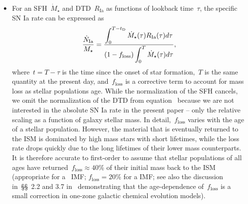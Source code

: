 \documentclass[ms.tex]{subfiles}
\begin{document}
\begin{itemize}
	\item For an SFH~$\dot{M}_\star$ and DTD~$R_\text{Ia}$ as functions of
	lookback time~$\tau$, the specific SN Ia rate can be expressed as
	\begin{equation}
	\frac{\dot{N}_\text{Ia}}{M_\star} =
	\frac{\displaystyle{
		\int_0^{T - t_\text{D}} \dot{M}_\star(\tau) R_\text{Ia}(\tau) d\tau
	}}{\displaystyle{
		(1 - f_\text{loss})\int_0^T \dot{M}_\star(\tau) d\tau
	}},
	\label{eq:specia}
	\end{equation}
	where~$t = T - \tau$ is the time since the onset of star formation,~$T$
	is the same quantity at the present day, and~$f_\text{loss}$ is a
	corrective term to account for mass loss as stellar populations age.
	While the normalization of the SFH cancels, we omit the normalization of
	the DTD from equation~ because we are not interested in the
	absolute SN Ia rate in the present paper -- only the relative scaling as a
	function of galaxy stellar mass.
	In detail,~$f_\text{loss}$ varies with the age of a stellar population.
	However, the material that is eventually returned to the ISM is dominated
	by high mass stars with short lifetimes, while the loss rate drops quickly
	due to the long lifetimes of their lower mass counterparts.
	It is therefore accurate to first-order to assume that stellar populations
	of all ages have returned~$f_\text{loss} \approx 40$\% of their initial
	mass back to the ISM (appropriate for a~\citealt{Kroupa2001} IMF;
	$f_\text{loss} = 20$\% for a \citealt{Salpeter1955} IMF; see also the
	discussion in~\S\S~2.2 and 3.7 in~\citealt*{Weinberg2017} demonstrating
	that the age-dependence of~$f_\text{loss}$ is a small correction in
	one-zone galactic chemical evolution models).



\end{itemize}
\end{document}
